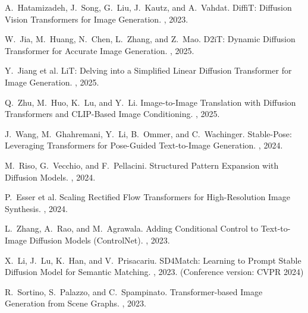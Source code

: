 \documentclass[a4paper]{article}
\begin{document}
\begin{thebibliography}{99}

A.~Hatamizadeh, J.~Song, G.~Liu, J.~Kautz, and A.~Vahdat.
\newblock DiffiT: Diffusion Vision Transformers for Image Generation.
, 2023.

W.~Jia, M.~Huang, N.~Chen, L.~Zhang, and Z.~Mao.
\newblock D2iT: Dynamic Diffusion Transformer for Accurate Image Generation.
, 2025.

Y.~Jiang et al.
\newblock LiT: Delving into a Simplified Linear Diffusion Transformer for Image Generation.
, 2025.

Q.~Zhu, M.~Huo, K.~Lu, and Y.~Li.
\newblock Image-to-Image Translation with Diffusion Transformers and CLIP-Based Image Conditioning.
, 2025.

J.~Wang, M.~Ghahremani, Y.~Li, B.~Ommer, and C.~Wachinger.
\newblock Stable-Pose: Leveraging Transformers for Pose-Guided Text-to-Image Generation.
, 2024.

M.~Riso, G.~Vecchio, and F.~Pellacini.
\newblock Structured Pattern Expansion with Diffusion Models.
, 2024.

P.~Esser et al.
\newblock Scaling Rectified Flow Transformers for High-Resolution Image Synthesis.
, 2024.

L.~Zhang, A.~Rao, and M.~Agrawala.
\newblock Adding Conditional Control to Text-to-Image Diffusion Models (ControlNet).
, 2023.

X.~Li, J.~Lu, K.~Han, and V.~Prisacariu.
\newblock SD4Match: Learning to Prompt Stable Diffusion Model for Semantic Matching.
, 2023.
\newblock (Conference version: CVPR 2024)

R.~Sortino, S.~Palazzo, and C.~Spampinato.
\newblock Transformer-based Image Generation from Scene Graphs.
, 2023.

\end{thebibliography}
\end{document}
